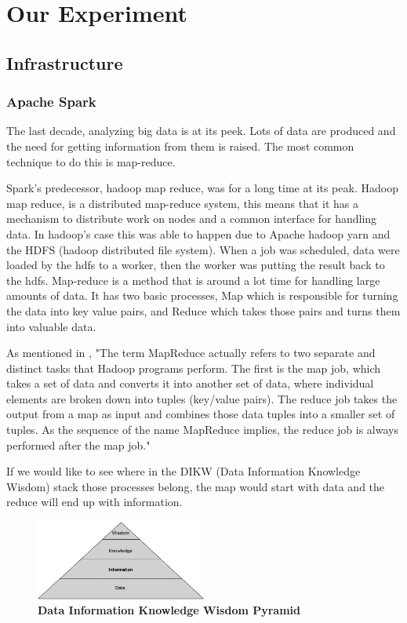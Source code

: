 \section{Our Experiment}
\subsection{Infrastructure}
\subsubsection{Apache Spark}
The last decade, analyzing big data is at its peek. Lots of data are produced and the need for getting information from them is raised. The most common technique to do this is map-reduce.

Spark's predecessor, hadoop map reduce, was for a long time at its peak.
 Hadoop map reduce, is a distributed map-reduce system, 
this means that it has a mechanism to distribute work on nodes 
and a common interface for handling data. In hadoop's case this was able
 to happen due to Apache hadoop yarn and the HDFS (hadoop distributed file system).
 When a job was scheduled, data were loaded by the hdfs to a worker, 
then the worker was putting the result back to the hdfs. 
Map-reduce is a method that is around a lot time for handling large amounts of data. It has two basic processes, Map which is responsible for turning the data into key value pairs, and Reduce which takes those pairs and turns them into valuable data.

As mentioned in \cite{ibmMapReduce:5}, "The term MapReduce actually refers to two separate and distinct tasks that Hadoop programs perform. The first is the map job, which takes a set of data and converts it into another set of data, where individual elements are broken down into tuples (key/value pairs). The reduce job takes the output from a map as input and combines those data tuples into a smaller set of tuples. As the sequence of the name MapReduce implies, the reduce job is always performed after the map job."

If we would like to see where in the DIKW (Data Information Knowledge Wisdom) stack those processes belong, the map would start with data and the reduce will end up with information.\\

\begin{figure}[h]
	\centering
	\includegraphics[width=0.5\textwidth]{images/DIKW.png}
	\caption{\bfseries Data Information Knowledge Wisdom Pyramid \cite{TheWisdomHierachy:7}}
	\label{dikw}
\end{figure}

